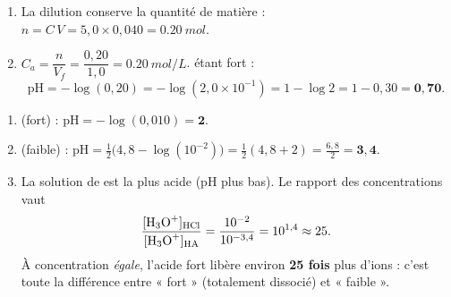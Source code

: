 \documentclass[11pt,a4paper]{article}
\begin{document}
\begin{corrige}
\begin{enumerate}[label=\alph*)]
  \item La dilution conserve la quantité de matière : $n = C\,V = 5{,}0 \times 0{,}040 = \qty{0,20}{mol}$.
  \item $C_a = \dfrac{n}{V_f} = \dfrac{0,20}{1,0} = \qty{0,20}{mol\per L}$.  étant fort :
        \[ \mathrm{pH} = -\log(0{,}20) = -\log(2{,}0\times10^{-1}) = 1 - \log 2 = 1 - 0{,}30 = \mathbf{0{,}70}. \]
\end{enumerate}
\end{corrige}

\begin{corrige}
\begin{enumerate}[label=\alph*)]
  \item {} (fort) : $\mathrm{pH} = -\log(0{,}010) = \mathbf{2}$.
  \item {} (faible) : $\mathrm{pH} = \tfrac12\bigl(4{,}8 - \log(10^{-2})\bigr) = \tfrac12(4{,}8 + 2)
        = \tfrac{6{,}8}{2} = \mathbf{3{,}4}$.
  \item La solution de  est la plus acide (pH plus bas). Le rapport des concentrations vaut
        \[ \frac{[\ce{H3O+}]_{\ce{HCl}}}{[\ce{H3O+}]_{\ce{HA}}} = \frac{10^{-2}}{10^{-3{,}4}} = 10^{1{,}4}
           \approx 25. \]
        À concentration \emph{égale}, l'acide fort libère environ \textbf{25 fois} plus d'ions  :
        c'est toute la différence entre « fort » (totalement dissocié) et « faible ».
\end{enumerate}
\end{corrige}
\end{document}
